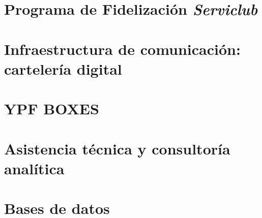 \documentclass[12pt]{article}
\begin{document}
\section{Programa de Fidelización \emph{Serviclub}}


%

\section{Infraestructura de comunicación: cartelería digital}


\section{YPF BOXES}
%



\section{Asistencia técnica y consultoría analítica}




\section{Bases de datos}

%
\end{document}
